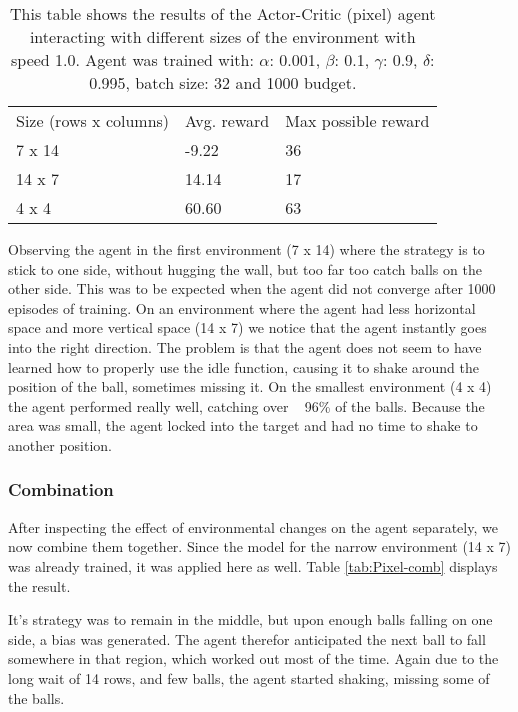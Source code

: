 \documentclass{article}
\begin{document}
    \begin{table}[]
    \begin{tabular}{lll}
    Size (rows x columns) & Avg. reward & Max possible reward \\
    7 x 14                & -9.22       & 36                  \\
    14 x 7                & 14.14       & 17                  \\
    4 x 4                 & 60.60       & 63                 
    \end{tabular}
    \caption{This table shows the results of the Actor-Critic (pixel) agent interacting with different sizes of the environment with speed 1.0. 
    Agent was trained with: $\alpha$: 0.001, $\beta$: 0.1, $\gamma$: 0.9, $\delta$: 0.995, batch size: 32 and 1000 budget. }
    \label{tab:Pixel-size}
    \end{table}
    
    Observing the agent in the first environment (7 x 14)  where the strategy is to stick to one side, without hugging the wall, but too far too catch balls on the other side. 
    This was to be expected when the agent did not converge after 1000 episodes of training. 
    On an environment where the agent had less horizontal space and more vertical space (14 x 7) we notice that the agent instantly goes into the right direction.
    The problem is that the agent does not seem to have learned how to properly use the idle function, causing it to shake around the position of the ball, sometimes missing it. 
    On the smallest environment (4 x 4) the agent performed really well, catching over ~ 96\% of the balls.
    Because the area was small, the agent locked into the target and had no time to shake to another position.
    
    \subsubsection{Combination}
    After inspecting the effect of environmental changes on the agent separately, we now combine them together. 
    Since the model for the narrow environment (14 x 7) was already trained, it was applied here as well. 
    Table \ref{tab:Pixel-comb} displays the result.
    
    It's strategy was to remain in the middle, but upon enough balls falling on one side, a bias was generated. 
    The agent therefor anticipated the next ball to fall somewhere in that region, which worked out most of the time.
    Again due to the long wait of 14 rows, and few balls, the agent started shaking, missing some of the balls. 
    
\end{document}

